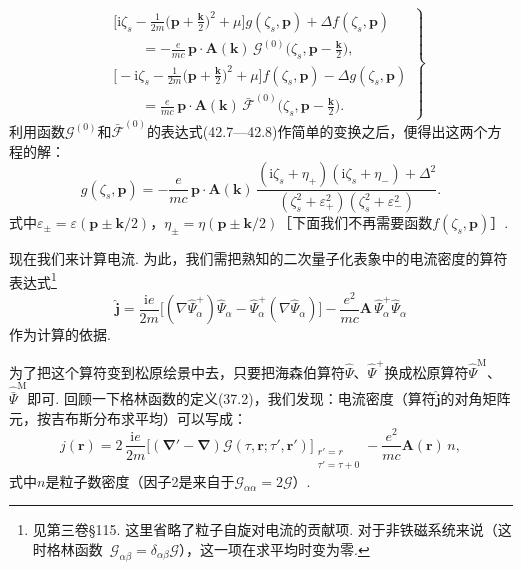\begin{equation}
\left.\begin{aligned}
&\biggl[\mathrm{i}\zeta_s-\frac{1}{2m}\biggl(\bm{p}+\frac{\bm{k}}{2}\biggr)^{\!2}+\mu\biggr]
g(\zeta_s,\bm{p})+\Delta f(\zeta_s,\bm{p})\\
&\qquad=-\frac{e}{mc}\,\bm{p}\cdot\bm{A}(\bm{k})\,
\mathcal{G}^{(0)}\biggl(\zeta_s,\bm{p}-\frac{\bm{k}}{2}\biggr),\\
&\biggl[-\mathrm{i}\zeta_s-\frac{1}{2m}\biggl(\bm{p}+\frac{\bm{k}}{2}\biggr)^{\!2}+\mu\biggr]
f(\zeta_s,\bm{p})-\Delta g(\zeta_s,\bm{p})\\
&\qquad=\frac{e}{mc}\,\bm{p}\cdot\bm{A}(\bm{k})\,
\bar{\mathcal{F}}^{(0)}\biggl(\zeta_s,\bm{p}-\frac{\bm{k}}{2}\biggr).
\end{aligned}\right\}
\end{equation}
利用函数$\mathcal{G}^{(0)}$和$\bar{\mathcal{F}}^{(0)}$的表达式(42.7—42.8)作简单的变换之后，便得出这两个方程的解：
\begin{equation}
g(\zeta_s,\bm{p})=-\frac{e}{mc}\,\bm{p}\cdot\bm{A}(\bm{k})\,
\frac{(\mathrm{i}\zeta_s+\eta_+)(\mathrm{i}\zeta_s+\eta_-)+\Delta^2}
{(\zeta_s^2+\varepsilon_+^2)(\zeta_s^2+\varepsilon_-^2)}.
\end{equation}
式中$\varepsilon_\pm=\varepsilon(\bm{p}\pm\bm{k}/2)$，$\eta_\pm=\eta(\bm{p}\pm\bm{k}/2)$［下面我们不再需要函数$f(\zeta_s,\bm{p})$］.

现在我们来计算电流. 为此，我们需把熟知的二次量子化表象中的电流密度的算符表达式\footnote{见第三卷§115. 这里省略了粒子自旋对电流的贡献项. 对于非铁磁系统来说（这时格林函数~$\mathcal{G}_{\alpha\beta}=\delta_{\alpha\beta}\mathcal{G}$），这一项在求平均时变为零.}
\begin{equation*}
\hat{\bm{j}}=\frac{\mathrm{i}e}{2m}
\bigl[(\nabla\hat{\Psi}^{+}_\alpha)\hat{\Psi}_\alpha
-\hat{\Psi}^{+}_\alpha(\nabla\hat{\Psi}_\alpha)\bigr]
-\frac{e^2}{mc}\bm{A}\,\hat{\Psi}^{+}_\alpha\hat{\Psi}_\alpha
\end{equation*}
作为计算的依据.

为了把这个算符变到松原绘景中去，只要把海森伯算符$\hat{\Psi}$、$\hat{\Psi}^{+}$换成松原算符$\hat{\Psi}^{\mathrm{M}}$、$\hat{\bar{\Psi}}^{\mathrm{M}}$即可. 回顾一下格林函数的定义(37.2)，我们发现：电流密度（算符$\hat{\bm{j}}$的对角矩阵元，按吉布斯分布求平均）可以写成：
\begin{equation}
j(\bm{r})=2\,\frac{\mathrm{i}e}{2m}
\bigl[(\bm{\nabla}'-\bm{\nabla})\mathcal{G}(\tau,\bm{r};\tau',\bm{r}')\bigr]_{\substack{r'=r\\ \tau'=\tau+0}}
-\frac{e^2}{mc}\bm{A}(\bm{r})\,n,
\end{equation}
式中$n$是粒子数密度（因子2是来自于$\mathcal{G}_{\alpha\alpha}=2\mathcal{G}$）.


